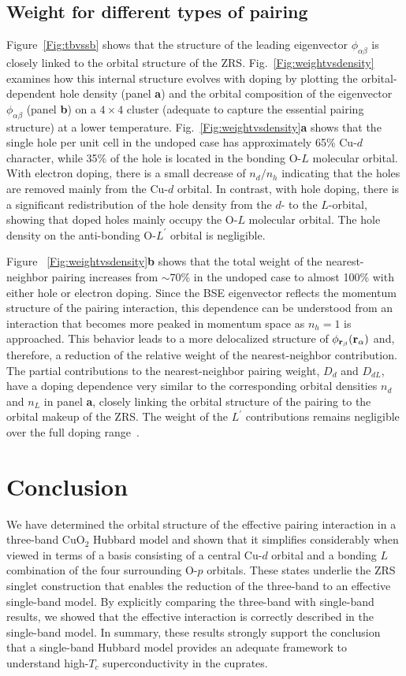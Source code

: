 \documentclass[fleqn,twocolumn,11pt]{wlscirep}
\begin{document}
\subsection*{Weight for different types of pairing}
Figure~\ref{Fig:tbvssb} shows that the structure of the leading eigenvector $\phi_{\alpha\beta}$ is closely linked to the orbital structure of the ZRS. Fig.~\ref{Fig:weightvsdensity} examines how this internal structure evolves with doping by plotting the orbital-dependent hole density (panel {\bf a}) and the orbital composition of the eigenvector $\phi_{\alpha\beta}$ (panel {\bf b}) on a $4\times 4$ cluster (adequate to capture the essential pairing structure) at a lower temperature.  Fig.~\ref{Fig:weightvsdensity}{\bf a} shows that the single hole per unit cell in the undoped case has approximately 65\% Cu-$d$ character, while 35\% of the hole is located in the bonding O-$L$ molecular orbital. With electron doping, there is a small decrease of $n_d/n_h$ indicating that the holes are removed mainly from the Cu-$d$ orbital. In contrast, with hole doping, there is a significant redistribution of the hole density from the $d$- to the $L$-orbital, showing that doped holes mainly occupy the O-$L$ molecular orbital. The hole density on the anti-bonding O-$L^\prime$ orbital is negligible. 

Figure ~\ref{Fig:weightvsdensity}{\bf b} shows that the total weight of the nearest-neighbor pairing increases from $\sim 70$\% in the undoped case to almost 100\% with either hole or electron doping. Since the BSE eigenvector reflects the momentum structure of the pairing interaction, this dependence can be understood from an interaction that becomes more peaked in momentum space as $n_h=1$ is approached. This behavior leads to a more delocalized structure of $\phi_{{\bf r}_\beta}({\bf r}_\alpha)$ and, therefore, a reduction of the relative weight of the nearest-neighbor contribution. The partial contributions to the nearest-neighbor pairing weight, $D_{d}$ and $D_{dL}$, have a doping dependence very similar to the corresponding orbital densities $n_d$ and $n_L$ in panel {\bf a}, closely linking the orbital structure of the pairing to the orbital makeup of the ZRS. The weight of the $L^\prime$ contributions remains negligible over the full doping range~\cite{supplement}. 

\section*{Conclusion}
We have determined the orbital structure of the effective pairing interaction in a three-band CuO$_2$ Hubbard model and shown that it simplifies considerably when viewed in terms of a basis consisting of a central Cu-$d$ orbital and a bonding $L$ combination of the four surrounding O-$p$ orbitals. These states underlie the ZRS singlet construction that enables the reduction of the three-band to an effective single-band model. By explicitly comparing the three-band with single-band results, we showed that the effective interaction is correctly described in the single-band model. In summary, these results strongly support the conclusion that a single-band Hubbard model provides an adequate framework to understand high-$T_c$ superconductivity in the cuprates.
\end{document}
